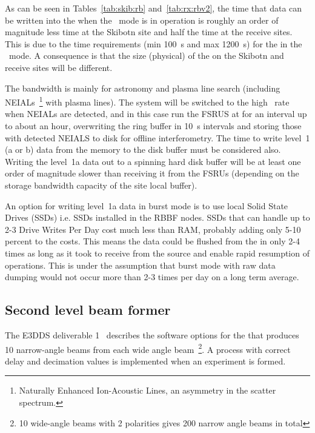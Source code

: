\documentclass[12pt,a4paper]{article}
\begin{document}
As can be seen in Tables~\ref{tab:skib:rb} and~\ref{tab:rx:rbv2}, the time that data can be written into the \RB when the \WBW\ mode is in operation is roughly an order of magnitude less time at the Skibotn site and half the time at the receive sites.
This is due to the time requirements (min 100~s and max 1200~s) for the \RB in the \NBW\ mode. 
A consequence is that the size (physical) of the \RB on the Skibotn and receive sites will be different.
\fi

The \WBW{} bandwidth is mainly for astronomy and plasma line search (including NEIALs~\footnote{Naturally Enhanced Ion-Acoustic Lines, an asymmetry in the scatter spectrum.} with plasma lines). 
The system will be switched to the high \WBW\ rate when NEIALs are detected, and in this case run the FSRUS at \WBW{} for an interval up to about an hour, overwriting the ring buffer in 10~s intervals and storing those with detected NEIALS to disk for offline interferometry.
The time to write level~1 (a or b) data from the \RB memory to the disk buffer must be considered also. 
Writing the level~1a data out to a spinning hard disk buffer will be at least one order of magnitude slower than receiving it from the FSRUs (depending on the storage bandwidth capacity of the site local buffer). %

An option for writing level~1a data in burst mode is to use local Solid State Drives (SSDs) i.e. SSDs installed in the RBBF nodes. 
SSDs that can handle up to 2-3 Drive Writes Per Day cost much less than RAM, probably adding only 5-10 percent to the \RB costs. 
This means the \WBW{} data could be flushed from the \RB in only 2-4 times as long as it took to receive from the source and enable rapid resumption of \NBW{} operations. 
This is under the assumption that \WBW{} burst mode with raw data dumping would not occur more than 2-3 times per day on a long term average. 

\subsection{Second level beam former} \label{ssec:sbf}

The E3DDS deliverable 1~\cite{e3dds-do1} describes the software options for the \SBF that produces 10 narrow-angle beams from each wide angle beam~\footnote{10 wide-angle beams with 2 polarities gives 200 narrow angle beams in total}. 
A \SBF process with correct delay and decimation values is implemented when an experiment is formed. 
\end{document}
